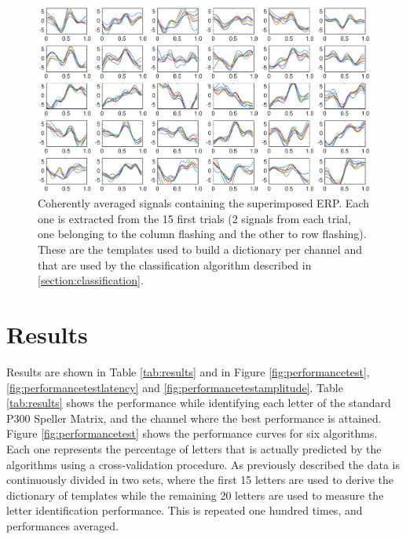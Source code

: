 \documentclass[brainsci,article,submit,moreauthors,pdftex,10pt,a4paper]{mdpi}
\begin{document}
\begin{figure}[H]
\centering
\includegraphics[width=15cm]{images/dictionary.eps}
\caption{Coherently averaged signals containing the superimposed ERP.  Each one is extracted from the 15 first trials (2 signals from each trial, one belonging to the column flashing and the other to row flashing).  These are the templates used to build a dictionary per channel and that are used by the classification algorithm described in \ref{section:classification}.}
\label{fig:dictionaryfig}
\end{figure}


\section{Results}
\label{section:results}

Results are shown in Table \ref{tab:results} and in Figure \ref{fig:performancetest},\ref{fig:performancetestlatency} and \ref{fig:performancetestamplitude}.  Table \ref{tab:results} shows the  performance while identifying each letter of the standard P300 Speller Matrix, and the channel where the best performance is attained.   Figure \ref{fig:performancetest} shows the performance curves for six algorithms.  Each one represents the percentage of letters that is actually predicted by the algorithms using a cross-validation procedure.  As previously described the data is continuously divided in two sets, where the first 15 letters are used to derive the dictionary of templates while the remaining 20 letters are used to measure the letter identification performance. This is repeated one hundred times, and performances averaged.   
\end{document}
